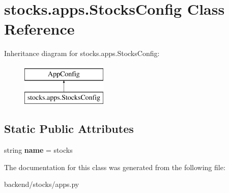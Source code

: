 \hypertarget{classstocks_1_1apps_1_1_stocks_config}{}\section{stocks.\+apps.\+Stocks\+Config Class Reference}
\label{classstocks_1_1apps_1_1_stocks_config}
Inheritance diagram for stocks.\+apps.\+Stocks\+Config\+:\begin{figure}[H]
\begin{center}
\leavevmode
\includegraphics[height=2.000000cm]{classstocks_1_1apps_1_1_stocks_config}
\end{center}
\end{figure}
\subsection*{Static Public Attributes}
\begin{DoxyCompactItemize}
\item 
\mbox{\label{classstocks_1_1apps_1_1_stocks_config_a03c22491b56cbcf361424667992e02cb}} 
string {\bfseries name} = \textquotesingle{}stocks\textquotesingle{}
\end{DoxyCompactItemize}


The documentation for this class was generated from the following file\+:\begin{DoxyCompactItemize}
\item 
backend/stocks/apps.\+py\end{DoxyCompactItemize}

